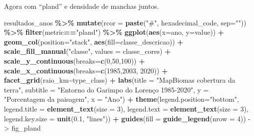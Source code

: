 \documentclass[
]{article}
\newenvironment{Shaded}{\begin{snugshade}}{\end{snugshade}}
\newcommand{\AttributeTok}[1]{\textcolor[rgb]{0.13,0.29,0.53}{#1}}
\newcommand{\DecValTok}[1]{\textcolor[rgb]{0.00,0.00,0.81}{#1}}
\newcommand{\FloatTok}[1]{\textcolor[rgb]{0.00,0.00,0.81}{#1}}
\newcommand{\FunctionTok}[1]{\textcolor[rgb]{0.13,0.29,0.53}{\textbf{#1}}}
\newcommand{\NormalTok}[1]{#1}
\newcommand{\OtherTok}[1]{\textcolor[rgb]{0.56,0.35,0.01}{#1}}
\newcommand{\SpecialCharTok}[1]{\textcolor[rgb]{0.81,0.36,0.00}{\textbf{#1}}}
\newcommand{\StringTok}[1]{\textcolor[rgb]{0.31,0.60,0.02}{#1}}
\begin{document}
Agora com ``pland'' e densidade de manchas juntos.

\begin{Shaded}
\begin{Highlighting}[]
\NormalTok{resultados\_anos }\SpecialCharTok{\%\textgreater{}\%} 
  \FunctionTok{mutate}\NormalTok{(}\AttributeTok{rcor =} \FunctionTok{paste}\NormalTok{(}\StringTok{"\#"}\NormalTok{, hexadecimal\_code, }\AttributeTok{sep=}\StringTok{""}\NormalTok{)) }\SpecialCharTok{\%\textgreater{}\%} 
  \FunctionTok{filter}\NormalTok{(metric}\SpecialCharTok{==}\StringTok{"pland"}\NormalTok{) }\SpecialCharTok{\%\textgreater{}\%}
  \FunctionTok{ggplot}\NormalTok{(}\FunctionTok{aes}\NormalTok{(}\AttributeTok{x=}\NormalTok{ano, }\AttributeTok{y=}\NormalTok{value)) }\SpecialCharTok{+} 
  \FunctionTok{geom\_col}\NormalTok{(}\AttributeTok{position=}\StringTok{"stack"}\NormalTok{, }\FunctionTok{aes}\NormalTok{(}\AttributeTok{fill=}\NormalTok{classe\_descricao)) }\SpecialCharTok{+} 
  \FunctionTok{scale\_fill\_manual}\NormalTok{(}\StringTok{"classe"}\NormalTok{, }\AttributeTok{values =}\NormalTok{ classe\_cores) }\SpecialCharTok{+}
  \FunctionTok{scale\_y\_continuous}\NormalTok{(}\AttributeTok{breaks=}\FunctionTok{c}\NormalTok{(}\DecValTok{0}\NormalTok{,}\DecValTok{50}\NormalTok{,}\DecValTok{100}\NormalTok{)) }\SpecialCharTok{+} 
  \FunctionTok{scale\_x\_continuous}\NormalTok{(}\AttributeTok{breaks=}\FunctionTok{c}\NormalTok{(}\DecValTok{1985}\NormalTok{,}\DecValTok{2003}\NormalTok{, }\DecValTok{2020}\NormalTok{)) }\SpecialCharTok{+}
  \FunctionTok{facet\_grid}\NormalTok{(raio\_km}\SpecialCharTok{\textasciitilde{}}\NormalTok{type\_class) }\SpecialCharTok{+} 
  \FunctionTok{labs}\NormalTok{(}\AttributeTok{title =} \StringTok{"MapBiomas cobertura da terra"}\NormalTok{, }
\AttributeTok{subtitle =} \StringTok{"Entorno do Garimpo do Lorenço 1985{-}2020"}\NormalTok{,}
\AttributeTok{y =} \StringTok{"Porcentagem da paisagem"}\NormalTok{, }
\AttributeTok{x =} \StringTok{"Ano"}\NormalTok{) }\SpecialCharTok{+} 
\FunctionTok{theme}\NormalTok{(}\AttributeTok{legend.position=}\StringTok{"bottom"}\NormalTok{, }
      \AttributeTok{legend.title =} \FunctionTok{element\_text}\NormalTok{(}\AttributeTok{size =} \DecValTok{3}\NormalTok{), }
              \AttributeTok{legend.text  =} \FunctionTok{element\_text}\NormalTok{(}\AttributeTok{size =} \DecValTok{3}\NormalTok{),}
              \AttributeTok{legend.key.size =} \FunctionTok{unit}\NormalTok{(}\FloatTok{0.1}\NormalTok{, }\StringTok{"lines"}\NormalTok{)) }\SpecialCharTok{+} 
\FunctionTok{guides}\NormalTok{(}\AttributeTok{fill =} \FunctionTok{guide\_legend}\NormalTok{(}\AttributeTok{nrow =} \DecValTok{4}\NormalTok{)) }\OtherTok{{-}\textgreater{}}\NormalTok{ fig\_pland}


\end{Highlighting}
\end{Shaded}
\end{document}
